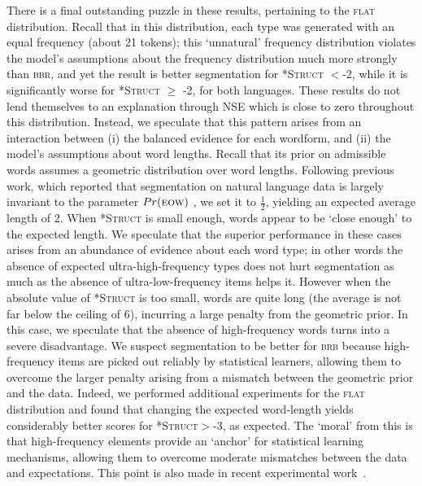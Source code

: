 \documentclass[11pt]{article}
\begin{document}
There is a final outstanding puzzle in these results, pertaining to the \textsc{flat} distribution. Recall that in this distribution, each type was generated with an equal frequency (about 21 tokens); this `unnatural' frequency distribution violates the model's assumptions about the frequency distribution much more strongly than \textsc{bbr}, and yet the result is better segmentation for \textsc{*Struct} $<$-2, while it is significantly worse for \textsc{*Struct} $\geq$ -2, for both languages. These results do not lend themselves to an explanation through NSE which is close to zero throughout this distribution. Instead, we speculate that this pattern arises from an interaction between (i) the balanced evidence for each wordform, and (ii) the model's assumptions about word lengths. Recall that its prior on admissible words assumes a geometric distribution over word lengths. Following previous work, which reported that segmentation on natural language data is largely invariant to the parameter $Pr(\textsc{eow})$ \cite{Goldwater09a}, we set it to $\frac{1}{2}$, yielding an expected average length of 2. When \textsc{*Struct} is small enough, words appear to be `close enough' to the expected length. We speculate that the superior performance in these cases arises from an abundance of evidence about each word type; in other words the absence of expected ultra-high-frequency types does not hurt segmentation as much as the absence of ultra-low-frequency items helps it. However when the absolute value of \textsc{*Struct} is too small, words are quite long (the average is not far below the ceiling of 6), incurring a large penalty from the geometric prior. In this case, we speculate that the absence of high-frequency words turns into a severe disadvantage. We suspect segmentation to be better for \textsc{brb} because high-frequency items are picked out reliably by statistical learners, allowing them to overcome the larger penalty arising from a mismatch between the geometric prior and the data. Indeed, we performed additional experiments for the \textsc{flat} distribution and found that changing the expected word-length yields considerably better scores for \textsc{*Struct}$>$-3, as expected.%
 The `moral' from this is that high-frequency elements provide an `anchor' for statistical learning mechanisms, allowing them to overcome moderate mismatches between the data and expectations. This point is also made in recent experimental work~\cite{Kurumada13a}.
\end{document}
